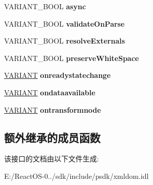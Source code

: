 \begin{DoxyCompactItemize}
V\+A\+R\+I\+A\+N\+T\+\_\+\+B\+O\+OL {\bfseries async}
\item 
\mbox{\label{interface_i_x_m_l_d_o_m_document_a4d01e8de88f7053c53ab479253a26bcc}} 
V\+A\+R\+I\+A\+N\+T\+\_\+\+B\+O\+OL {\bfseries validate\+On\+Parse}
\item 
\mbox{\label{interface_i_x_m_l_d_o_m_document_a48123356482c698acf2af284699db0ad}} 
V\+A\+R\+I\+A\+N\+T\+\_\+\+B\+O\+OL {\bfseries resolve\+Externals}
\item 
\mbox{\label{interface_i_x_m_l_d_o_m_document_a469bc596dbeadf828789db4142b4d8e5}} 
V\+A\+R\+I\+A\+N\+T\+\_\+\+B\+O\+OL {\bfseries preserve\+White\+Space}
\item 
\mbox{\label{interface_i_x_m_l_d_o_m_document_a74e510ebdaef1aa16dd43fc47fe57cf3}} 
\hyperlink{structtag_v_a_r_i_a_n_t}{V\+A\+R\+I\+A\+NT} {\bfseries onreadystatechange}
\item 
\mbox{\label{interface_i_x_m_l_d_o_m_document_adfff3488f7581d9aef6e21a79fcc8322}} 
\hyperlink{structtag_v_a_r_i_a_n_t}{V\+A\+R\+I\+A\+NT} {\bfseries ondataavailable}
\item 
\mbox{\label{interface_i_x_m_l_d_o_m_document_aa124f92f93e7c19581f81cb2a21a7d1d}} 
\hyperlink{structtag_v_a_r_i_a_n_t}{V\+A\+R\+I\+A\+NT} {\bfseries ontransformnode}
\end{DoxyCompactItemize}
\subsection*{额外继承的成员函数}


该接口的文档由以下文件生成\+:\begin{DoxyCompactItemize}
\item 
E\+:/\+React\+O\+S-\/0../sdk/include/psdk/xmldom.\+idl\end{DoxyCompactItemize}
